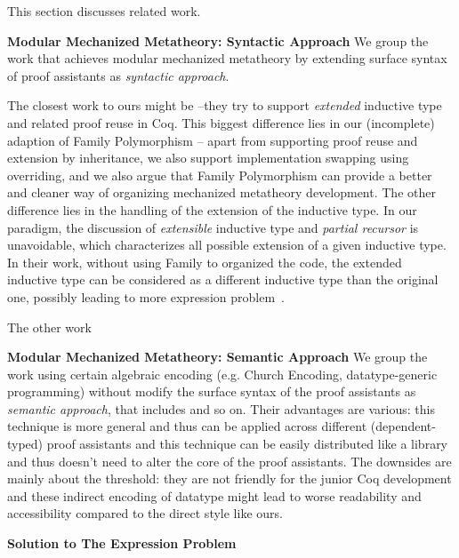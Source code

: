 This section discusses related work.




\textbf{Modular Mechanized Metatheory: Syntactic Approach} We group the work that achieves modular mechanized metatheory by extending surface syntax of proof assistants as \textit{syntactic approach}. 

The closest work to ours might be \citet{boite2004proo}--they try to support \textit{extended} inductive type and related proof reuse in Coq. This biggest difference lies in our (incomplete) adaption of Family Polymorphism -- apart from supporting proof reuse and extension by inheritance, we also support implementation swapping using overriding, and we also argue that Family Polymorphism can provide a better and cleaner way of organizing mechanized metatheory development. The other difference lies in the handling of the extension of the inductive type. In our paradigm, the discussion of \textit{extensible} inductive type and \textit{partial recursor} is unavoidable, which characterizes all possible extension of a given inductive type. In their work, without using Family to organized the code, the extended inductive type can be considered as a different inductive type than the original one, possibly leading to more expression problem~\cite{wadler-ep}. 



The other work

\textbf{Modular Mechanized Metatheory: Semantic Approach} We group the work using certain algebraic encoding (e.g. Church Encoding, datatype-generic programming) without modify the surface syntax of the proof assistants as \textit{semantic approach}, that includes \citet{delaware2013,forsta2020,liwei2022,schwaab2013modular, keuchel2013generic} and so on. Their advantages are various: this technique is more general and thus can be applied across different (dependent-typed) proof assistants and this technique can be easily distributed like a library and thus doesn't need to alter the core of the proof assistants. The downsides are mainly about the threshold: they are not friendly for the junior Coq development and these indirect encoding of datatype might lead to worse readability and accessibility compared to the direct style like ours.




\textbf{Solution to The Expression Problem}
